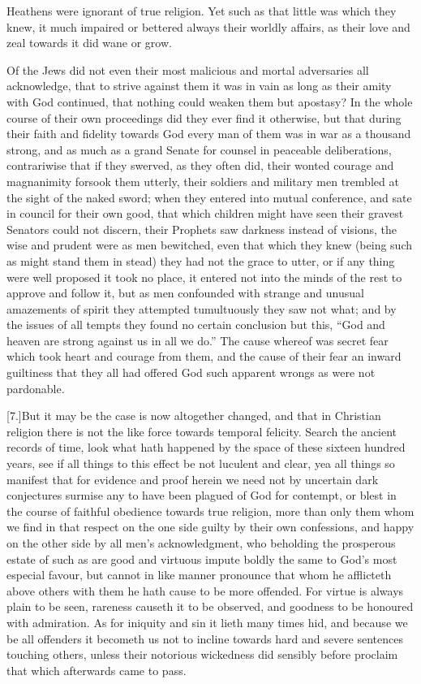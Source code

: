 Heathens were ignorant of true religion. Yet such as that little was which they knew, it much impaired or bettered always their worldly affairs, as their love and zeal towards it did wane or grow.

Of the Jews did not even their most malicious and mortal adversaries all acknowledge, that to strive against them it was in vain as long as their amity with God continued, that nothing could weaken them but apostasy? In the whole course of their own proceedings did they ever find it otherwise, but that during their faith and fidelity towards God every man of them was in war as a thousand strong, and as much as a grand Senate for counsel in peaceable deliberations, contrariwise that if they swerved, as they often did, their wonted courage and magnanimity forsook them utterly, their soldiers and military men trembled at the sight of the naked sword; when they entered into mutual conference, and sate in council for their own good, that which children might have seen their gravest Senators could not discern, their Prophets saw darkness instead of visions, the wise and prudent were as men bewitched, even that which they knew (being such as might stand them in stead) they had not the grace to utter, or if any thing were well proposed it took no place, it entered not into the minds of the rest to approve and follow it, but as men confounded with strange and unusual amazements of spirit they attempted tumultuously they saw not what; and by the issues of all tempts they found no certain conclusion but this, “God and heaven are strong against us in all we do.” The cause whereof was secret fear which took heart and courage from them, and the cause of their fear an inward guiltiness that they all had offered God such apparent wrongs as were not pardonable.

[7.]But it may be the case is now altogether changed, and that in Christian religion there is not the like force towards  temporal felicity.
 Search the ancient records of time, look what hath happened by the space of these sixteen hundred years, see if all things to this effect be not luculent and clear, yea all things so manifest that for evidence and proof herein we need not by uncertain dark conjectures surmise any to have been plagued of God for contempt, or blest in the course of faithful obedience towards true religion, more than only them whom we find in that respect on the one side guilty by their own confessions, and happy on the other side by all men’s acknowledgment, who beholding the prosperous estate of such as are good and virtuous impute boldly the same to God’s most especial favour, but cannot in like manner pronounce that whom he afflicteth above others with them he hath cause to be more offended. For virtue is always plain to be seen, rareness causeth it to be observed, and goodness to be honoured with admiration. As for iniquity and sin it lieth many times hid, and because we be all offenders it becometh us not to incline towards hard and severe sentences touching others, unless their notorious wickedness did sensibly before proclaim that which afterwards came to pass.

